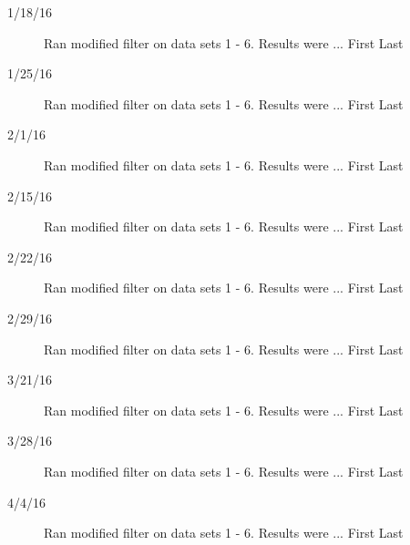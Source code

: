 \begin{description}
\item [1/18/16]  Ran modified filter on data sets 1 - 6.  Results were ... \hfill{First Last}

\item [1/25/16]  Ran modified filter on data sets 1 - 6.  Results were ... \hfill{First Last}

\item [2/1/16]  Ran modified filter on data sets 1 - 6.  Results were ... \hfill{First Last}

\item [2/15/16]  Ran modified filter on data sets 1 - 6.  Results were ... \hfill{First Last}

\item [2/22/16]  Ran modified filter on data sets 1 - 6.  Results were ... \hfill{First Last}

\item [2/29/16]  Ran modified filter on data sets 1 - 6.  Results were ... \hfill{First Last}

\item [3/21/16]  Ran modified filter on data sets 1 - 6.  Results were ... \hfill{First Last}

\item [3/28/16]  Ran modified filter on data sets 1 - 6.  Results were ... \hfill{First Last}

\item [4/4/16]  Ran modified filter on data sets 1 - 6.  Results were ... \hfill{First Last}
\end{description}
